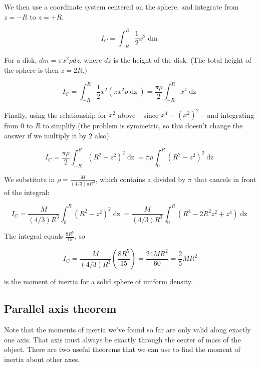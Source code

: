 We then use a coordinate system centered on the sphere, and integrate from $z = -R$ to $z = +R$.

\begin{equation}
I_C = \int_{-R}^{R} \frac{1}{2} x^2 \mathop{dm}
\end{equation}

For a disk, $dm = \pi x^2 \rho dz$, where $dz$ is the height of the disk. (The total height of the sphere is then $z = 2R$.)

\begin{equation}
I_C = \int_{-R}^{R} \frac{1}{2} x^2 (\pi x^2 \rho \mathop{dz}) = \frac{\pi \rho}{2} \int_{-R}^{R} x^4 \mathop{dz}
\end{equation}

Finally, using the relationship for $x^2$ above -- since $x^4 = (x^2)^2$ -- and integrating from $0$ to $R$ to simplify (the problem is symmetric, so this doesn't change the answer if we multiply it by 2 also)

\begin{equation}
I_C = \frac{\pi \rho}{2} \int_{-R}^{R} (R^2 - z^2)^2 \mathop{dz} = \pi \rho \int_{0}^{R} (R^2 - z^2)^2 \mathop{dz}
\end{equation}

We substitute in $\displaystyle \rho = \frac{M}{(4/3) \pi R^3}$, which contains a divided by $\pi$ that cancels in front of the integral:

\begin{equation}
I_C = \frac{M}{(4/3) R^3} \int_{0}^{R} (R^2 - z^2)^2 \mathop{dz} = \frac{M}{(4/3) R^3} \int_{0}^{R} \left(R^4 - 2 R^2 z^2 + z^4 \right)\mathop{dz}
\end{equation}

The integral equals $\displaystyle \frac{8 R^5}{15}$, so

\begin{equation}
I_C = \frac{M}{(4/3) R^3} \left(\frac{8 R^5}{15}\right) = \frac{24 M R^2}{60} = \frac{2}{5} M R^2
\end{equation}

is the moment of inertia for a solid sphere of uniform density.

\subsection{Parallel axis theorem}

Note that the moments of inertia we've found so far are only valid along exactly one axis. That axis must always be exactly through the center of mass of the object. There are two useful theorems that we can use to find the moment of inertia about other axes.

